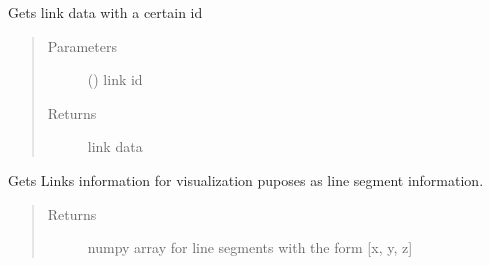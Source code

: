 \documentclass[letterpaper,10pt,english]{sphinxmanual}
\begin{document}
\begin{fulllineitems}
\begin{fulllineitems}
\begin{quote}
\begin{description}
\end{description}\end{quote}

\end{fulllineitems}


\begin{fulllineitems}
\label{\detokenize{api:beamon.database.Database.get_link_with_id}}
Gets link data with a certain id
\begin{quote}\begin{description}
\item[{Parameters}] \leavevmode
{} () \textendash{} link id

\item[{Returns}] \leavevmode
link data

\end{description}\end{quote}

\end{fulllineitems}


\begin{fulllineitems}
\label{\detokenize{api:beamon.database.Database.get_links}}
Gets Links information for visualization puposes as line segment information.
\begin{quote}\begin{description}
\item[{Returns}] \leavevmode
numpy array for line segments with the form {[}x, y, z{]}

\end{description}\end{quote}

\end{fulllineitems}



\end{fulllineitems}
\end{document}
